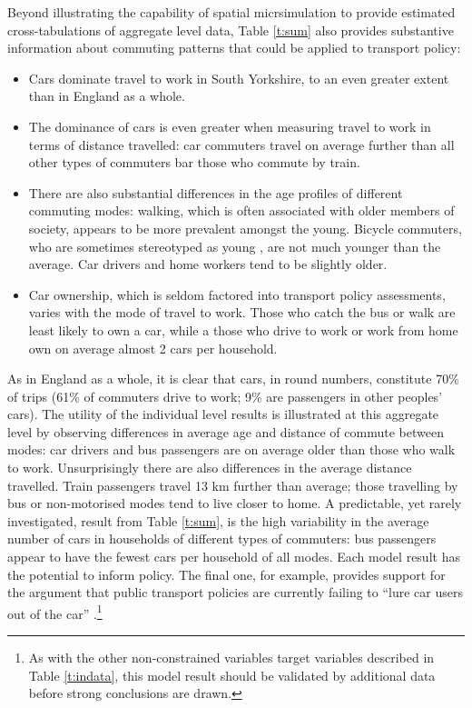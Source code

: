Beyond illustrating the capability of spatial micrsimulation to provide
estimated cross-tabulations of aggregate level data,
Table \ref{t:sum} also provides substantive information
about commuting patterns that could be applied to transport policy:
\begin{itemize}
 \item Cars dominate travel to work in South Yorkshire, to an
even greater extent than in England as a whole.
\item The dominance of cars is even greater when measuring travel
to work in terms of distance travelled: car commuters travel on
average further than all other types of commuters bar those who commute
by train.
\item There are also substantial differences in the age profiles of
different commuting modes: walking, which is often associated with older
members of society, appears to be more prevalent amongst the young. Bicycle commuters,
who are sometimes stereotyped as young \citep{Daley2011}, are not much younger
than the average. Car drivers and home workers tend to be slightly older.
\item Car ownership, which is seldom factored into transport policy assessments,
\citep{Kay2011}
varies with the mode of travel to work. Those who catch the bus or walk are least
likely to own a car, while a those who drive to work or work from home own on
average almost 2 cars per household.
\end{itemize}


As in England as a whole, it is clear that cars, in round numbers, constitute
70\% of trips (61\% of commuters drive to work; 9\%
are passengers in other peoples' cars). The utility of the individual level
results is illustrated at this aggregate level by observing differences in
average age and distance of commute between modes: car drivers and bus
passengers are on average older than those who walk to work.
Unsurprisingly there are also differences in the average distance
travelled. Train passengers travel 13 km further than average;
those travelling by bus or non-motorised modes tend to live closer
to home.
A predictable, yet rarely investigated, result from Table \ref{t:sum},
is the high variability in the average number of cars in households of different
types of commuters: bus passengers appear to have the fewest cars per household
of all modes. Each model result has the potential to inform policy. The final one,
for example, provides support for the argument
 that public transport policies are currently failing to
 ``lure car users out of the car''
\citep[p.~193]{Davison2006}.\footnote{As
with the
other non-constrained variables target variables described in Table
\ref{t:indata}, this model result should be validated by additional data before
strong conclusions are drawn.}

